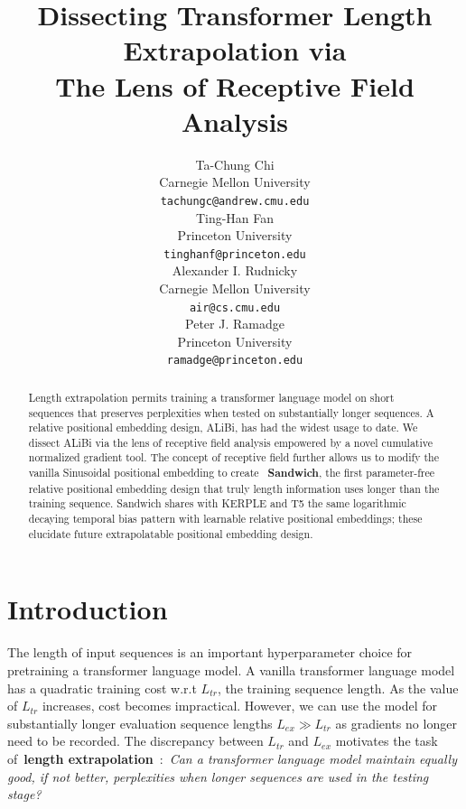 \documentclass[11pt]{article}
\title{Dissecting Transformer Length Extrapolation via \\ The Lens of Receptive Field Analysis}
\author{Ta-Chung Chi \\
  Carnegie Mellon University \\
  \texttt{tachungc@andrew.cmu.edu} \\\And
  Ting-Han Fan \\
  Princeton University \\
  \texttt{tinghanf@princeton.edu} \\\AND
  Alexander I. Rudnicky \\
  Carnegie Mellon University \\
  \texttt{air@cs.cmu.edu} \\\And
  Peter J. Ramadge \\
  Princeton University \\
  \texttt{ramadge@princeton.edu}
}
\theoremstyle{plain}
\begin{document}
\maketitle
\begin{abstract}
Length extrapolation permits training a transformer language model on short sequences that preserves perplexities when tested on substantially longer sequences.
A relative positional embedding design, ALiBi, has had the widest usage to date. 
We dissect ALiBi via the lens of receptive field analysis empowered by a novel cumulative normalized gradient tool. The concept of receptive field further allows us to modify the vanilla Sinusoidal positional embedding to create  ~\textbf{Sandwich}, the first parameter-free relative positional embedding design that truly length information uses longer than the training sequence. Sandwich shares with KERPLE and T5 the same logarithmic decaying temporal bias pattern with learnable relative positional embeddings; these elucidate future extrapolatable positional embedding design.
\end{abstract}

\section{Introduction}
The length of input sequences is an important hyperparameter choice for pretraining a transformer language model. 
A vanilla transformer language model has a quadratic training cost w.r.t $L_{tr}$, the training sequence length. 
As  the value of $L_{tr}$ increases, cost becomes impractical. 
However, we can use the model for substantially longer evaluation sequence lengths $L_{ex}\gg L_{tr}$ as gradients no longer need to be recorded. 
The discrepancy between $L_{tr}$ and $L_{ex}$  motivates the task of~\textbf{length extrapolation}~\cite{press2022train}:~\emph{Can a transformer language model maintain equally good, if not better, perplexities when longer sequences are used in the testing stage?}
\end{document}
